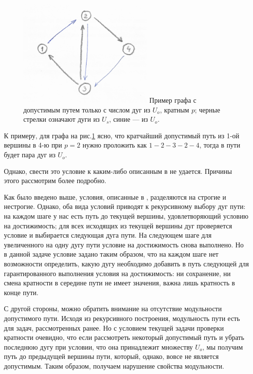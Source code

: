 \begin{figure}
	\centering
	{\includegraphics[width=0.6\textwidth]{img/2.png}}
	{Пример графа с допустимым путем только с числом дуг из $U_o$, кратным $p$; черные стрелки означают дуги из $U_s$, синие --- из $U_o$.}
	\label{fig:pic_2}
\end{figure}

К примеру, для графа на рис.\ref{fig:pic_2} ясно, что кратчайший допустимый путь из 1-ой вершины в 4-ю при $p = 2$ нужно проложить как $1-2-3-2-4$, тогда в пути будет пара дуг из $U_o$.

Однако, свести это условие к каким-либо описанным в \cite{Mono} не удается. Причины этого рассмотрим более подробно.

Как было введено выше, условия, описанные в \cite{Mono}, разделяются на строгие и нестрогие. Однако, оба вида условий приводят к рекурсивному выбору дуг пути: на каждом шаге у нас есть путь до текущей вершины, удовлетворяющий условию на достижимость; для всех исходящих из текущей вершины дуг проверяется условие и выбирается следующая дуга пути. На следующем шаге для увеличенного на одну дугу пути условие на достижимость снова выполнено. Но в данной задаче условие задано таким образом, что на каждом шаге нет возможности определить, какую дугу необходимо добавить в путь следующей для гарантированного выполнения условия на достижимость: ни сохранение, ни смена кратности в середине пути не имеет значения, важна лишь кратность в конце пути. 

С другой стороны, можно обратить внимание на отсутствие модульности допустимого пути. Исходя из рекурсивного построения, модульность пути есть для задач, рассмотренных ранее. Но с условием текущей задачи проверки кратности очевидно, что если рассмотреть некоторый допустимый путь и убрать последнюю дугу при условии, что она принадлежит множеству $U_o$, мы получим путь до предыдущей вершины пути, который, однако, вовсе не является допустимым. Таким образом, получаем нарушение свойства модульности. 

